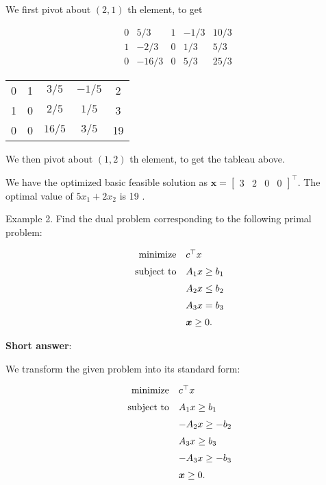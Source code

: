 We first pivot about \((2,1)\) th element, to get

\begin{equation*}
	\begin{array}{cccc|c}
		0 & 5 / 3 & 1 & -1 / 3 & 10 / 3 \\
		1 & -2 / 3 & 0 & 1 / 3 & 5 / 3 \\
		\hline 0 & -16 / 3 & 0 & 5 / 3 & 25 / 3
	\end{array}
\end{equation*}

\begin{center}
	\begin{tabular}{cccc|c}
		0 & 1 & \(3 / 5\) & \(-1 / 5\) & 2 \\
		1 & 0 & \(2 / 5\) & \(1 / 5\) & 3 \\
		\hline
		0 & 0 & \(16 / 5\) & \(3 / 5\) & 19 \\
		\hline
	\end{tabular}
\end{center}

We then pivot about \((1,2)\) th element, to get the tableau above.

We have the optimized basic feasible solution as \(\boldsymbol{x}=\left[\begin{array}{llll}3 & 2 & 0 & 0\end{array}\right]^{\top}\). The optimal value of \(5 x_{1}+2 x_{2}\) is 19 .


\medskip
\noindent
Example 2. Find the dual problem corresponding to the following primal problem:

\[
	\begin{array}{rl}
		\operatorname{minimize} & c^{\top} x \vspace{2mm}\\
		\text { subject to} & A_{1} x \geq b_{1} \vspace{2mm}\\
		& A_{2} x \leq b_{2} \vspace{2mm}\\
		& A_{3} x=b_{3} \vspace{2mm}\\
		& \boldsymbol{x} \geq 0 .
	\end{array}
\]

\textbf{Short answer}:

We transform the given problem into its standard form:

\[
	\begin{array}{rl}
		\operatorname{ minimize} & c^{\top} x \vspace{2mm} \\
		\text { subject to} & A_{1} x \geq b_{1} \vspace{2mm} \\
		& -A_{2} x \geq-b_{2} \vspace{2mm} \\
		& A_{3} x \geq b_{3} \vspace{2mm} \\
		& -A_{3} x \geq-b_{3} \vspace{2mm} \\
		& \boldsymbol{x} \geq 0 .
	\end{array}
\]

